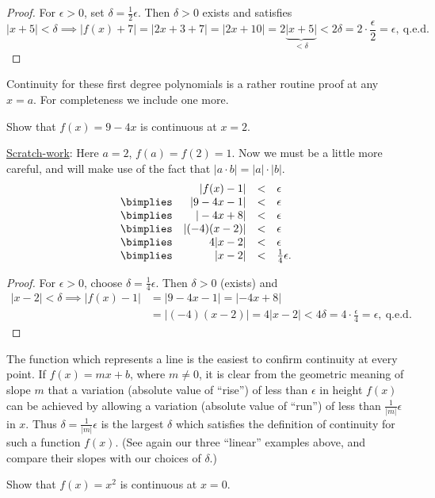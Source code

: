 \begin{proof} For $\epsilon>0$, set $\delta=\frac12\epsilon$.  Then
$\delta>0$ exists and satisfies 
$$
|x+5|<\delta\implies|f(x)+7|=|2x+3+7|=|2x+10|
=2\underbrace{|x+5|}_{<\delta}<2\delta=2\cdot\frac{\epsilon}2=\epsilon,
\mathrm{\ q.e.d.}
$$
\end{proof}
\eex
Continuity for these first degree polynomials is a rather routine
proof at any $x=a$.  For completeness we include one more.

\bex Show that $f(x)=9-4x$ is continuous at $x=2$.

\qquad\underline{Scratch-work}: Here $a=2$, $f(a)=f(2)=1$.
Now we must be a little more
careful, and will make use of the fact that $|a\cdot b|=|a|\cdot|b|$. 
$$\begin{array}{crcl}&|f(x)-1|&<&\epsilon\\
\bimplies&|9-4x-1|&<&\epsilon\\
\bimplies&|-4x+8|&<&\epsilon\\
\bimplies&|(-4)(x-2)|&<&\epsilon\\
\bimplies&4|x-2|&<&\epsilon\\
\bimplies&|x-2|&<&\frac14\epsilon.\end{array}$$

\begin{proof} For $\epsilon>0$, choose $\delta=\frac14\epsilon$.
Then $\delta>0$ (exists) and
\begin{align*}
|x-2|<\delta\implies|f(x)-1|&=|9-4x-1|=|-4x+8|\\
&=|(-4)(x-2)|=4|x-2|<4\delta=4\cdot\frac{\epsilon}4=\epsilon,
\mathrm{\ q.e.d.}\end{align*}
\end{proof}
\eex

The function which represents a line is the easiest to confirm
continuity at every point.  If $f(x)=mx+b$, where $m\ne0$, it is
clear from the geometric meaning of slope $m$ 
that a variation (absolute value of
``rise'') of less than $\epsilon$ in height $f(x)$
can be achieved by allowing a variation (absolute value of ``run'') 
of less than
$\frac1{|m|}\epsilon$ in $x$.  Thus $\delta=\frac1{|m|}\epsilon$
is the largest $\delta$ which satisfies the definition of
continuity for such a function $f(x)$. (See again
our three ``linear'' examples above, and compare their slopes
with our choices of $\delta$.)



\bex Show that $f(x)=x^2$ is continuous at $x=0$.

